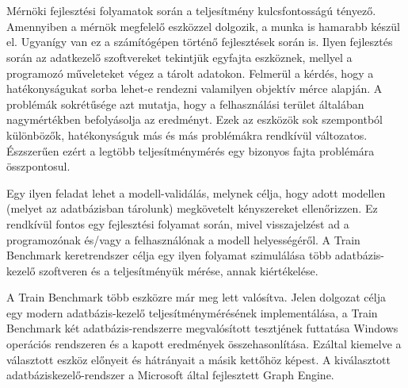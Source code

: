\chapter{\bevezetes}

Mérnöki fejlesztési folyamatok során a teljesítmény kulcsfontosságú tényező. Amennyiben a mérnök megfelelő eszközzel dolgozik, a munka is hamarabb készül el. Ugyanígy van ez a számítógépen történő fejlesztések során is. Ilyen fejlesztés során az adatkezelő szoftvereket tekintjük egyfajta eszköznek, mellyel a programozó műveleteket végez a tárolt adatokon. Felmerül a kérdés, hogy a hatékonyságukat sorba lehet-e rendezni valamilyen objektív mérce alapján. A problémák sokrétűsége azt mutatja, hogy a felhasználási terület általában nagymértékben befolyásolja az eredményt. Ezek az eszközök sok szempontból különbözők, hatékonyságuk más és más problémákra rendkívül változatos. Észszerűen ezért a legtöbb teljesítménymérés egy bizonyos fajta problémára összpontosul.

Egy ilyen feladat lehet a modell-validálás, melynek célja, hogy adott modellen (melyet az adatbázisban tárolunk) megkövetelt kényszereket ellenőrizzen. Ez rendkívül fontos egy fejlesztési folyamat során, mivel visszajelzést ad a programozónak és/vagy a felhasználónak a modell helyességéről. A Train Benchmark keretrendszer célja egy ilyen folyamat szimulálása több adatbázis-kezelő szoftveren és a teljesítményük mérése, annak kiértékelése.



A Train Benchmark több eszközre már meg lett valósítva. Jelen dolgozat célja egy modern adatbázis-kezelő teljesítménymérésének implementálása, a Train Benchmark két adatbázis-rendszerre megvalósított tesztjének futtatása Windows operációs rendszeren és a kapott eredmények összehasonlítása. Ezáltal kiemelve a választott eszköz előnyeit és hátrányait a másik kettőhöz képest. A kiválasztott adatbáziskezelő-rendszer a Microsoft által fejlesztett Graph Engine.



